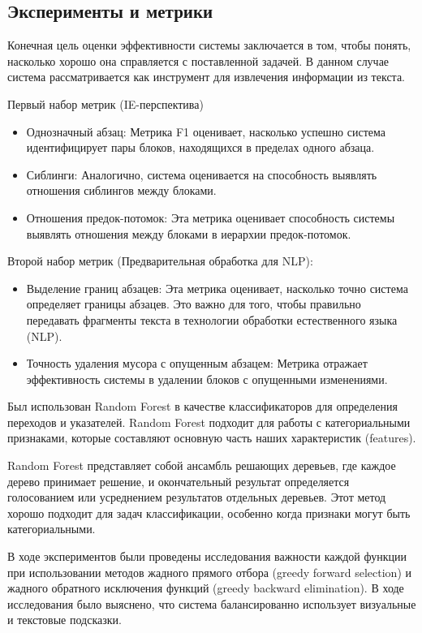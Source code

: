 \subsection{Эксперименты и метрики}
Конечная цель оценки эффективности системы заключается в том, чтобы понять, насколько хорошо она справляется с поставленной задачей. В данном случае система рассматривается как инструмент для извлечения информации из текста.

Первый набор метрик (IE-перспектива)
\begin{itemize}
\item Однозначный абзац: Метрика F1 оценивает, насколько успешно система идентифицирует пары блоков, находящихся в пределах одного абзаца.

\item Сиблинги: Аналогично, система оценивается на способность выявлять отношения сиблингов между блоками.

\item Отношения предок-потомок: Эта метрика оценивает способность системы выявлять отношения между блоками в иерархии предок-потомок.

\end{itemize}

Второй набор метрик (Предварительная обработка для NLP):
\begin{itemize}
\item Выделение границ абзацев: Эта метрика оценивает, насколько точно система определяет границы абзацев. Это важно для того, чтобы правильно передавать фрагменты текста в технологии обработки естественного языка (NLP).

\item Точность удаления мусора с опущенным абзацем: Метрика отражает эффективность системы в удалении блоков с опущенными изменениями.
\end{itemize}

Был использован Random Forest в качестве классификаторов для определения переходов и указателей. Random Forest подходит для работы с категориальными признаками, которые составляют основную часть наших характеристик (features).

Random Forest представляет собой ансамбль решающих деревьев, где каждое дерево принимает решение, и окончательный результат определяется голосованием или усреднением результатов отдельных деревьев. Этот метод хорошо подходит для задач классификации, особенно когда признаки могут быть категориальными.

В ходе экспериментов были проведены исследования важности каждой функции при использовании методов жадного прямого отбора (greedy forward selection) и жадного обратного исключения функций (greedy backward elimination). В ходе исследования было выяснено, что система балансированно использует визуальные и текстовые подсказки.

